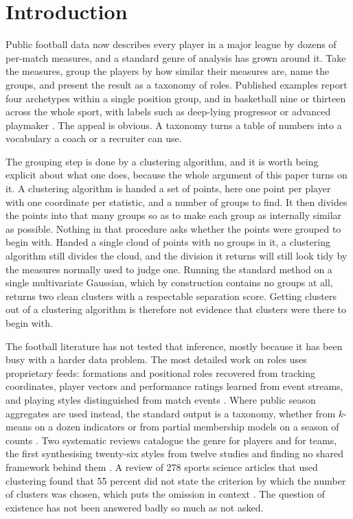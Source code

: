 \section{Introduction}
\label{sec:intro}

Public football data now describes every player in a major league by dozens of per-match
measures, and a standard genre of analysis has grown around it. Take the measures, group the
players by how similar their measures are, name the groups, and present the result as a
taxonomy of roles. Published examples report four archetypes within a single position group,
and in basketball nine or thirteen across the whole sport, with labels such as deep-lying
progressor or advanced playmaker \citep{elfoukahi2026unveiling, kalman2020nba,
alagappan2012from}. The appeal is obvious. A taxonomy turns a table of numbers into a
vocabulary a coach or a recruiter can use.

The grouping step is done by a clustering algorithm, and it is worth being explicit about what
one does, because the whole argument of this paper turns on it. A clustering algorithm is
handed a set of points, here one point per player with one coordinate per statistic, and a
number of groups to find. It then divides the points into that many groups so as to make each
group as internally similar as possible. Nothing in that procedure asks whether the points
were grouped to begin with. Handed a single cloud of points with no groups in it, a clustering
algorithm still divides the cloud, and the division it returns will still look tidy by the
measures normally used to judge one. Running the standard method on a single multivariate
Gaussian, which by construction contains no groups at all, returns two clean clusters with a
respectable separation score. Getting clusters out of a clustering algorithm is
therefore not evidence that clusters were there to begin with.

The football literature has not tested that inference, mostly because it has been busy with a
harder data problem. The most detailed work on roles uses proprietary feeds: formations and
positional roles recovered from tracking coordinates, player vectors and performance ratings
learned from event streams, and playing styles distinguished from match events
\citep{bialkowski2014large, decroos2019player, pappalardo2019playerank,
aalbers2019distinguishing}. Where public season aggregates are used instead, the standard
output is a taxonomy, whether from $k$-means on a dozen indicators or from partial membership
models on a season of counts \citep{elfoukahi2026unveiling, seri2024partial}. Two systematic
reviews catalogue the genre for players and for teams, the first synthesising twenty-six
styles from twelve studies and finding no shared framework behind them
\citep{plakias2023identifying, gu2025playing}. A review of 278 sports science articles that
used clustering found that 55 percent did not state the criterion by which the number of
clusters was chosen, which puts the omission in context \citep{fernandez2024reporting}. The
question of existence has not been answered badly so much as not asked.

